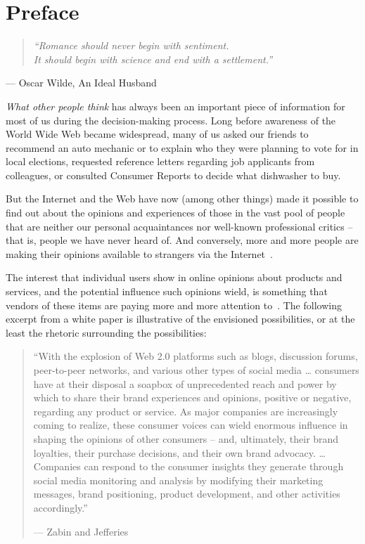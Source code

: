 \section{Preface}
\label{sec:preface}

\hfill

\begin{quote}
\centering
\textit{
``Romance should never begin with sentiment. \\
It should begin with science and end with a settlement.''
}
\end{quote}
\hfill --- Oscar Wilde, An Ideal Husband

\hfill

\hfill

\emph{What other people think} has always been an important piece of information
for most of us during the decision-making process.
Long before awareness of the World Wide Web became widespread,
many of us asked our friends to recommend an auto mechanic
or to explain who they were planning to vote for in local elections,
requested reference letters regarding job applicants from colleagues,
or consulted Consumer Reports to decide what dishwasher to buy.

But the Internet and the Web have now (among other things) made it possible
to find out about the opinions and experiences of those in the vast pool of people that are neither our personal acquaintances
nor well-known professional critics --
that is, people we have never heard of.
And conversely, more and more people are making their opinions available
to strangers via the Internet~\cite{PL08}.

The interest that individual users show in online opinions
about products and services,
and the potential influence such opinions wield,
is something that vendors of these items are paying more and more attention to~\cite{Hof08}.
The following excerpt from a white paper is illustrative
of the envisioned possibilities,
or at the least the rhetoric surrounding the possibilities:

\begin{quote}
``With the explosion of Web 2.0 platforms
such as blogs, discussion forums, peer-to-peer networks,
and various other types of social media \dots
consumers have at their disposal a soapbox
of unprecedented reach and power
by which to share their brand experiences and opinions,
positive or negative, regarding any product or service.
As major companies are increasingly coming to realize,
these consumer voices can wield enormous influence
in shaping the opinions of other consumers --
and, ultimately, their brand loyalties, their purchase decisions,
and their own brand advocacy. \dots
Companies can respond to the consumer insights they generate
through social media monitoring and analysis
by modifying their marketing messages, brand positioning, product development,
and other activities accordingly.''

\hfill --- Zabin and Jefferies~\cite{ZJ08}
\end{quote}

